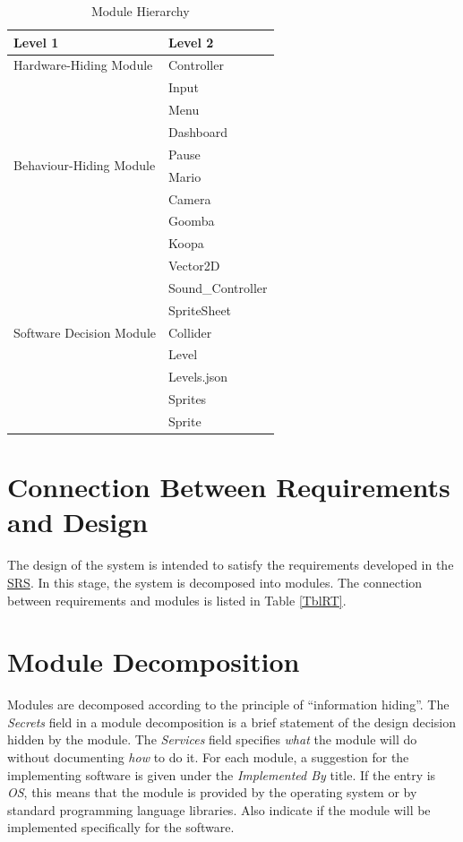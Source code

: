 \documentclass[12pt, titlepage]{article}
\begin{document}
\begin{table}[h!]
\centering
\begin{tabular}{p{} p{}}
\toprule
\textbf{Level 1} & \textbf{Level 2}\\
\midrule

{Hardware-Hiding Module} & Controller \\
\midrule

\multirow{8}{0.3\textwidth}{Behaviour-Hiding Module} & Input\\
& Menu \\
& Dashboard\\
& Pause\\
& Mario\\
& Camera\\
& Goomba \\
& Koopa \\
\midrule

\multirow{7}{0.3\textwidth}{Software Decision Module} & Vector2D\\
& Sound\_Controller\\
& SpriteSheet\\
& Collider\\
& Level\\
& Levels.json\\
& Sprites \\
& Sprite\\
\bottomrule

\end{tabular}
\caption{Module Hierarchy}
\label{TblMH}
\end{table}

\section{Connection Between Requirements and Design} \label{SecConnection}

The design of the system is intended to satisfy the requirements developed in
the \href{https://gitlab.cas.mcmaster.ca/jandric/super-refactored-mario-bros/-/blob/master/Doc/SRS/SRS.pdf}{SRS}. In this stage, the system is decomposed into modules. The connection between requirements and modules is listed in Table \ref{TblRT}.

\section{Module Decomposition} \label{SecMD}

Modules are decomposed according to the principle of ``information hiding''. The \emph{Secrets} field in a module
decomposition is a brief statement of the design decision hidden by the
module. The \emph{Services} field specifies \emph{what} the module will do
without documenting \emph{how} to do it. For each module, a suggestion for the
implementing software is given under the \emph{Implemented By} title. If the
entry is \emph{OS}, this means that the module is provided by the operating
system or by standard programming language libraries.  Also indicate if the
module will be implemented specifically for the software.
\end{document}
